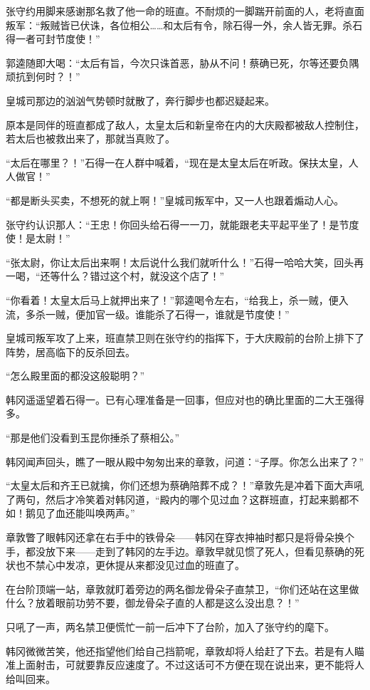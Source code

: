 张守约用脚来感谢那名救了他一命的班直。不耐烦的一脚踹开前面的人，老将直面叛军：“叛贼皆已伏诛，各位相公……和太后有令，除石得一外，余人皆无罪。杀石得一者可封节度使！”

郭逵随即大喝：“太后有旨，今次只诛首恶，胁从不问！蔡确已死，尔等还要负隅顽抗到何时？！”

皇城司那边的汹汹气势顿时就散了，奔行脚步也都迟疑起来。

原本是同伴的班直都成了敌人，太皇太后和新皇帝在内的大庆殿都被敌人控制住，若太后也被救出来了，那就当真败了。

“太后在哪里？！”石得一在人群中喊着，“现在是太皇太后在听政。保扶太皇，人人做官！”

“都是断头买卖，不想死的就上啊！”皇城司叛军中，又一人也跟着煽动人心。

张守约认识那人：“王忠！你回头给石得一一刀，就能跟老夫平起平坐了！是节度使！是太尉！”

“张太尉，你让太后出来啊！太后说什么我们就听什么！”石得一哈哈大笑，回头再一喝，“还等什么？错过这个村，就没这个店了！”

“你看着！太皇太后马上就押出来了！”郭逵喝令左右，“给我上，杀一贼，便入流，多杀一贼，便加官一级。谁能杀了石得一，谁就是节度使！”

皇城司叛军攻了上来，班直禁卫则在张守约的指挥下，于大庆殿前的台阶上排下了阵势，居高临下的反杀回去。

“怎么殿里面的都没这般聪明？”

韩冈遥遥望着石得一。已有心理准备是一回事，但应对也的确比里面的二大王强得多。

“那是他们没看到玉昆你捶杀了蔡相公。”

韩冈闻声回头，瞧了一眼从殿中匆匆出来的章敦，问道：“子厚。你怎么出来了？”

“太皇太后和齐王已就擒，你们还想为蔡确陪葬不成？！”章敦先是冲着下面大声吼了两句，然后才冷笑着对韩冈道，“殿内的哪个见过血？这群班直，打起来鹅都不如！鹅见了血还能叫唤两声。”

章敦瞥了眼韩冈还拿在右手中的铁骨朵——韩冈在穿衣抻袖时都只是将骨朵换个手，都没放下来——走到了韩冈的左手边。章敦早就见惯了死人，但看见蔡确的死状也不禁心中发凉，更休提从来都没见过血的班直了。

在台阶顶端一站，章敦就盯着旁边的两名御龙骨朵子直禁卫，“你们还站在这里做什么？放着眼前功劳不要，御龙骨朵子直的人都是这么没出息？！”

只吼了一声，两名禁卫便慌忙一前一后冲下了台阶，加入了张守约的麾下。

韩冈微微苦笑，他还指望他们给自己挡箭呢，章敦却将人给赶了下去。若是有人瞄准上面射击，可就要靠反应速度了。不过这话可不方便在现在说出来，更不能将人给叫回来。

